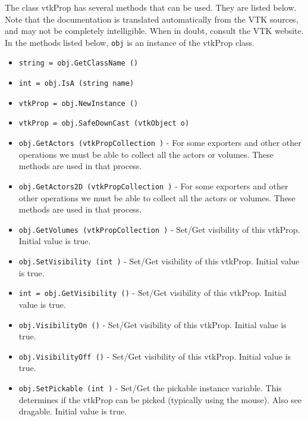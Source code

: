 The class vtkProp has several methods that can be used.
  They are listed below.
Note that the documentation is translated automatically from the VTK sources,
and may not be completely intelligible.  When in doubt, consult the VTK website.
In the methods listed below, \verb|obj| is an instance of the vtkProp class.
\begin{itemize}
\item  \verb|string = obj.GetClassName ()|

\item  \verb|int = obj.IsA (string name)|

\item  \verb|vtkProp = obj.NewInstance ()|

\item  \verb|vtkProp = obj.SafeDownCast (vtkObject o)|

\item  \verb|obj.GetActors (vtkPropCollection )| -  For some exporters and other other operations we must be
 able to collect all the actors or volumes. These methods
 are used in that process.

\item  \verb|obj.GetActors2D (vtkPropCollection )| -  For some exporters and other other operations we must be
 able to collect all the actors or volumes. These methods
 are used in that process.

\item  \verb|obj.GetVolumes (vtkPropCollection )| -  Set/Get visibility of this vtkProp. Initial value is true.

\item  \verb|obj.SetVisibility (int )| -  Set/Get visibility of this vtkProp. Initial value is true.

\item  \verb|int = obj.GetVisibility ()| -  Set/Get visibility of this vtkProp. Initial value is true.

\item  \verb|obj.VisibilityOn ()| -  Set/Get visibility of this vtkProp. Initial value is true.

\item  \verb|obj.VisibilityOff ()| -  Set/Get visibility of this vtkProp. Initial value is true.

\item  \verb|obj.SetPickable (int )| -  Set/Get the pickable instance variable.  This determines if the vtkProp
 can be picked (typically using the mouse). Also see dragable.
 Initial value is true.


\end{itemize}
